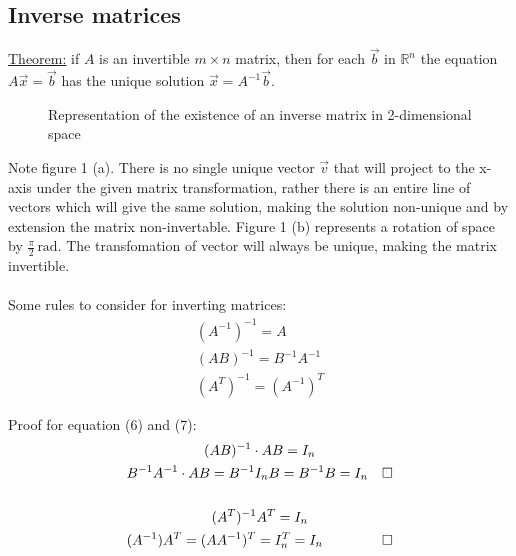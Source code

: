 \documentclass[11pt, a4paper]{article}
\newcommand*{\qed}{\hfill\ensuremath{\quad\square}}%
\newcommand*{\rad}{\ensuremath{\,\text{rad}}}
\begin{document}
\subsection{Inverse matrices}
\underline{Theorem:}
if $A$ is an invertible $m \times n$ matrix, then for each $\vec{b}$ in $\mathbb{R}^n$ the equation
$A\vec{x}=\vec{b}$ has the unique solution $\vec{x} = A^{-1}\vec{b}$.

\begin{figure}[h]
  \centering
  \qquad
  \caption{Representation of the existence of an inverse matrix in 2-dimensional space}
\end{figure}
Note figure 1 (a). There is no single unique vector $\vec{v}$ that will project to the x-axis under the
given matrix transformation, rather there is an entire line of vectors which will give the same solution,
making the solution non-unique and by extension the matrix non-invertable. Figure 1 (b) represents a rotation
of space by $\frac{\pi}{2}\rad$. The transfomation of vector will always be unique, making the matrix invertible.\\
\\
Some rules to consider for inverting matrices:
\begin{gather}
  (A^{-1})^{-1} = A\\
  (AB)^{-1} = B^{-1}A^{-1}\\
  (A^T)^{-1} = (A^{-1})^T
\end{gather}

Proof for equation (6) and (7):
\begin{gather*}
  (AB)^{-1} \cdot AB = I_n\\
  B^{-1}A^{-1} \cdot AB = B^{-1}I_nB = B^{-1}B = I_n \qed\\
  \\
  (A^T)^{-1} A^T = I_n\\
  (A^{-1})A^T = (AA^{-1})^T = I_n^T = I_n \qed
\end{gather*}
\end{document}
